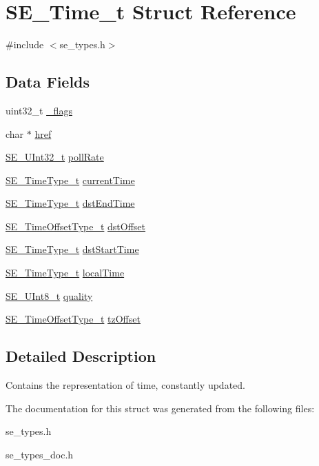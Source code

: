\hypertarget{structSE__Time__t}{}\section{S\+E\+\_\+\+Time\+\_\+t Struct Reference}
\label{structSE__Time__t}


{\ttfamily \#include $<$se\+\_\+types.\+h$>$}

\subsection*{Data Fields}
\begin{DoxyCompactItemize}
\item 
uint32\+\_\+t \hyperlink{group__Time_ga77ececb939204e19a09422aab87ca739}{\+\_\+flags}
\item 
char $\ast$ \hyperlink{group__Time_ga550afbd989e7f4252cde4854ce409321}{href}
\item 
\hyperlink{group__UInt32_ga70bd4ecda3c0c85d20779d685a270cdb}{S\+E\+\_\+\+U\+Int32\+\_\+t} \hyperlink{group__Time_ga56ef9035d9d9bd59708c6e229c12ac1d}{poll\+Rate}
\item 
\hyperlink{group__TimeType_ga6fba87a5b57829b4ff3f0e7638156682}{S\+E\+\_\+\+Time\+Type\+\_\+t} \hyperlink{group__Time_ga5cf45c45c382652cb37ce1a82a5168c5}{current\+Time}
\item 
\hyperlink{group__TimeType_ga6fba87a5b57829b4ff3f0e7638156682}{S\+E\+\_\+\+Time\+Type\+\_\+t} \hyperlink{group__Time_ga37d25a3c96a9202c1cfe1ebba752dfde}{dst\+End\+Time}
\item 
\hyperlink{group__TimeOffsetType_ga3de71705a6723a1013cf383b705cbd8a}{S\+E\+\_\+\+Time\+Offset\+Type\+\_\+t} \hyperlink{group__Time_gad39cc4dd3b9a9c27fc6bebc96087e759}{dst\+Offset}
\item 
\hyperlink{group__TimeType_ga6fba87a5b57829b4ff3f0e7638156682}{S\+E\+\_\+\+Time\+Type\+\_\+t} \hyperlink{group__Time_gaf4060734856defac5df4e4ebc2a18690}{dst\+Start\+Time}
\item 
\hyperlink{group__TimeType_ga6fba87a5b57829b4ff3f0e7638156682}{S\+E\+\_\+\+Time\+Type\+\_\+t} \hyperlink{group__Time_ga5ef728cdc93212ad86dbfd9cddf7cfb3}{local\+Time}
\item 
\hyperlink{group__UInt8_gaf7c365a1acfe204e3a67c16ed44572f5}{S\+E\+\_\+\+U\+Int8\+\_\+t} \hyperlink{group__Time_gaffccaff3c359127d182761e91ab28867}{quality}
\item 
\hyperlink{group__TimeOffsetType_ga3de71705a6723a1013cf383b705cbd8a}{S\+E\+\_\+\+Time\+Offset\+Type\+\_\+t} \hyperlink{group__Time_ga3017647596cbc5718fc84d97f7738684}{tz\+Offset}
\end{DoxyCompactItemize}


\subsection{Detailed Description}
Contains the representation of time, constantly updated. 

The documentation for this struct was generated from the following files\+:\begin{DoxyCompactItemize}
\item 
se\+\_\+types.\+h\item 
se\+\_\+types\+\_\+doc.\+h\end{DoxyCompactItemize}
